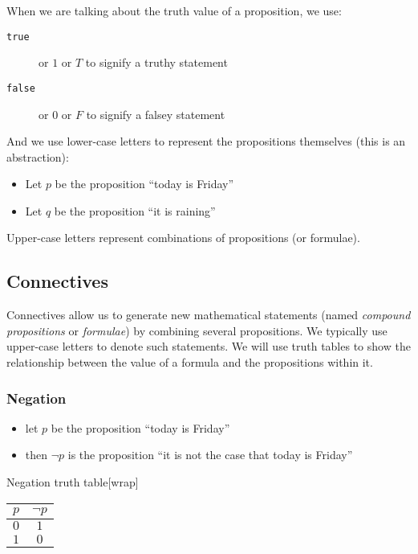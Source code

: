 When we are talking about the truth value of a proposition, we use:
\begin{description}
    \item[\texttt{true}] or \(1\) or \(T\) to signify a truthy statement
    \item[\texttt{false}] or \(0\) or \(F\) to signify a falsey statement
\end{description}
And we use lower-case letters to represent the propositions themselves (this is an abstraction):
\begin{itemize}
    \item Let \(p\) be the proposition ``today is Friday''
    \item Let \(q\) be the proposition ``it is raining''
\end{itemize}
Upper-case letters represent combinations of propositions (or formulae).

\subsection{Connectives}\label{sub:connectives_formal_reasoning}

Connectives allow us to generate new mathematical statements (named \emph{compound propositions} or \emph{formulae}) by combining several propositions.
We typically use upper-case letters to denote such statements.
We will use truth tables to show the relationship between the value of a formula and the propositions within it.

\subsubsection{Negation}\label{ssub:negation_connective}

\begin{itemize}[label={}]
    \item let \(p\) be the proposition ``today is Friday''
    \item then \(\neg p\) is the proposition ``it is not the case that today is Friday''
\end{itemize}

\begin{highlight}{Negation truth table}[wrap]
    \begin{tabular}{cc}
        \toprule
        \(p\) & \(\neg p\) \\
        \midrule
        \(0\) & \(1\)      \\
        \(1\) & \(0\)      \\
        \bottomrule
    \end{tabular}
\end{highlight}

